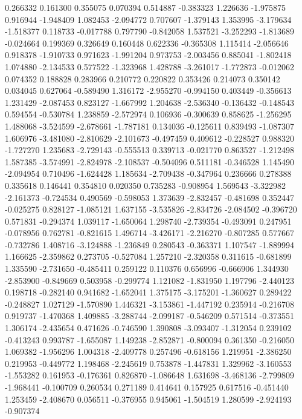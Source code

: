 0.266332
0.161300
0.355075
0.070394
0.514887
-0.383323
1.226636
-1.975875
0.916944
-1.948409
1.082453
-2.094772
0.707607
-1.379143
1.353995
-3.179634
-1.518377
0.118733
-0.017788
0.797790
-0.842058
1.537521
-3.252293
-1.813689
-0.024664
0.199369
0.326649
0.160448
0.622336
-0.365308
1.115414
-2.056646
0.918378
-1.910733
0.971623
-1.991204
0.973753
-2.003456
0.885041
-1.802418
1.074880
-2.134533
0.577522
-1.323968
1.428788
-3.261017
-1.772873
-0.012062
0.074352
0.188828
0.283966
0.210772
0.220822
0.353426
0.214073
0.350142
0.034045
0.627064
-0.589490
1.316172
-2.955270
-0.994150
0.403449
-0.356613
1.231429
-2.087453
0.823127
-1.667992
1.204638
-2.536340
-0.136432
-0.148543
0.594554
-0.530784
1.238859
-2.572974
0.106936
-0.300639
0.858625
-1.256295
1.488068
-3.524599
-2.678661
-1.787181
0.134036
-0.125611
0.839493
-1.087307
1.606976
-3.481080
-2.810629
-2.101673
-0.497459
0.409612
-0.228527
0.988320
-1.727270
1.235683
-2.729143
-0.555513
0.339713
-0.021770
0.863527
-1.212498
1.587385
-3.574991
-2.824978
-2.108537
-0.504096
0.511181
-0.346528
1.145490
-2.094954
0.710496
-1.624428
1.185634
-2.709438
-0.347964
0.236666
0.278388
0.335618
0.146441
0.354810
0.020350
0.735283
-0.908954
1.569543
-3.322982
-2.161373
-0.724534
0.490569
-0.598053
1.373639
-2.832457
-0.481698
0.352447
-0.025275
0.828127
-1.085121
1.637155
-3.535826
-2.834726
-2.084502
-0.396720
0.571831
-0.294374
1.039117
-1.650064
1.298740
-2.739354
-0.493091
0.247951
-0.078956
0.762781
-0.821615
1.496714
-3.426171
-2.216270
-0.807285
0.577667
-0.732786
1.408716
-3.124888
-1.236849
0.280543
-0.363371
1.107547
-1.889994
1.166625
-2.359862
0.273705
-0.527084
1.257210
-2.320358
0.311615
-0.681899
1.335590
-2.731650
-0.485411
0.259122
0.110376
0.656996
-0.666906
1.344930
-2.853900
-0.849669
0.503958
-0.299774
1.121082
-1.831950
1.197796
-2.440123
0.198718
-0.282140
0.941682
-1.652041
1.375175
-3.175201
-1.360627
0.289422
-0.248827
1.027129
-1.570890
1.446321
-3.153861
-1.447192
0.235914
-0.216708
0.919737
-1.470368
1.409885
-3.288744
-2.099187
-0.546209
0.571514
-0.373551
1.306174
-2.435654
0.471626
-0.746590
1.390808
-3.093407
-1.312054
0.239102
-0.413243
0.993787
-1.655087
1.149238
-2.852871
-0.800094
0.361350
-0.216050
1.069382
-1.956296
1.004318
-2.409778
0.257496
-0.618156
1.219951
-2.386250
0.219953
-0.449772
1.198468
-2.245619
0.753878
-1.447831
1.329962
-3.160553
-1.553282
0.161953
-0.176361
0.826870
-1.086648
1.631698
-3.468136
-2.799809
-1.968441
-0.100709
0.260534
0.271189
0.414641
0.157925
0.617516
-0.451440
1.253459
-2.408670
0.056511
-0.376955
0.945061
-1.504519
1.280599
-2.924193
-0.907374
